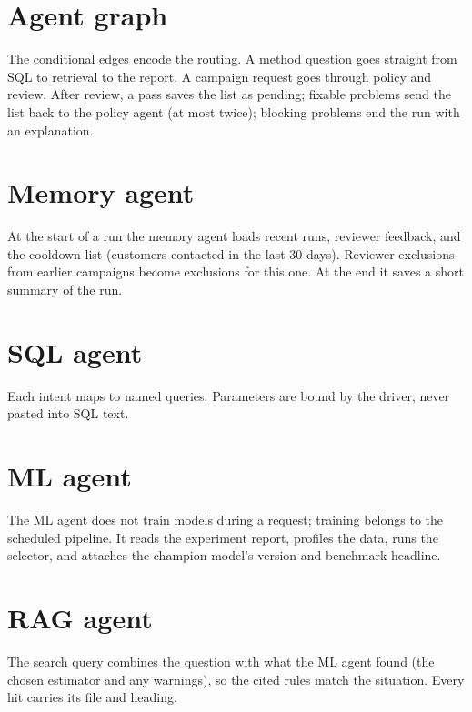 \documentclass[11pt]{article}
\begin{document}
\section{Agent graph}
\label{sec:graph}
The conditional edges encode the routing. A method question goes straight from SQL to retrieval to the report. A campaign request goes through policy and review. After review, a pass saves the list as pending; fixable problems send the list back to the policy agent (at most twice); blocking problems end the run with an explanation.

\section{Memory agent}
\label{sec:memory-agent}
At the start of a run the memory agent loads recent runs, reviewer feedback, and the cooldown list (customers contacted in the last 30 days). Reviewer exclusions from earlier campaigns become exclusions for this one. At the end it saves a short summary of the run.

\section{SQL agent}
\label{sec:sql-agent}
Each intent maps to named queries. Parameters are bound by the driver, never pasted into SQL text.

\section{ML agent}
\label{sec:ml-agent}
The ML agent does not train models during a request; training belongs to the scheduled pipeline. It reads the experiment report, profiles the data, runs the selector, and attaches the champion model's version and benchmark headline.

\section{RAG agent}
\label{sec:rag-agent}
The search query combines the question with what the ML agent found (the chosen estimator and any warnings), so the cited rules match the situation. Every hit carries its file and heading.
\end{document}
